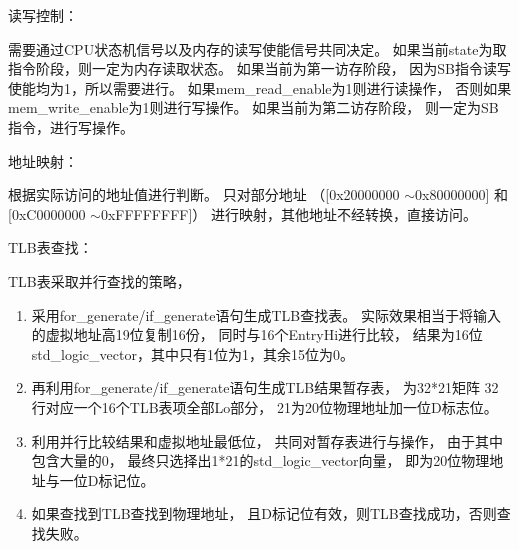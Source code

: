             读写控制：%
            \begin{minipage}[t]{0.8\linewidth}
                需要通过CPU状态机信号以及内存的读写使能信号共同决定。%
                如果当前state为取指令阶段，则一定为内存读取状态。%
                如果当前为第一访存阶段，%
                    因为SB指令读写使能均为1，所以需要进行。%
                    如果mem\_read\_enable为1则进行读操作，%
                    否则如果mem\_write\_enable为1则进行写操作。%
                如果当前为第二访存阶段，%
                    则一定为SB指令，进行写操作。%
            \end{minipage}
            
            地址映射：%
            \begin{minipage}[t]{0.8\linewidth}
                根据实际访问的地址值进行判断。%
                只对部分地址%
                （[0x20000000 $\sim$0x80000000]%
                和%
                [0xC0000000 $\sim$0xFFFFFFFF]）%
                进行映射，其他地址不经转换，直接访问。%
            \end{minipage}
            
            
            TLB表查找：%
            \begin{minipage}[t]{0.8\linewidth}
                TLB表采取并行查找的策略，%
                \begin{enumerate}
                \item
                    采用for\_generate/if\_generate语句生成TLB查找表。%
                    实际效果相当于将输入的虚拟地址高19位复制16份，%
                    同时与16个EntryHi进行比较，%
                    结果为16位std\_logic\_vector，其中只有1位为1，其余15位为0。%
                \item
                    再利用for\_generate/if\_generate语句生成TLB结果暂存表，%
                    为32*21矩阵%
                    32行对应一个16个TLB表项全部Lo部分，%
                    21为20位物理地址加一位D标志位。%
                \item
                    利用并行比较结果和虚拟地址最低位，%
                    共同对暂存表进行与操作，%
                    由于其中包含大量的0，%
                    最终只选择出1*21的std\_logic\_vector向量，%
                    即为20位物理地址与一位D标记位。%
                \item
                    如果查找到TLB查找到物理地址，%
                    且D标记位有效，则TLB查找成功，否则查找失败。%
                \end{enumerate}
            \end{minipage}
                
